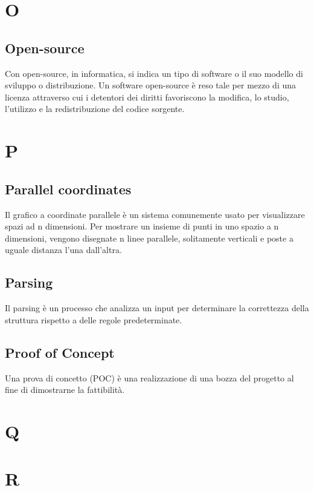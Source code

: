 \section{O}
\subsection{Open-source}
Con open-source, in informatica, si indica un tipo di software o il suo modello di sviluppo o distribuzione. Un software open-source è reso tale per mezzo di una licenza attraverso cui i detentori dei diritti favoriscono la modifica, lo studio, l'utilizzo e la redistribuzione del codice sorgente.

\newpage
\section{P}
\subsection{Parallel coordinates}
Il grafico a coordinate parallele è un sistema comunemente usato per visualizzare spazi ad n dimensioni. Per mostrare un insieme di punti in uno spazio a n dimensioni, vengono disegnate n linee parallele, solitamente verticali e poste a uguale distanza l'una dall'altra.

\subsection{Parsing}
Il parsing è un processo che analizza un input per determinare la correttezza della struttura rispetto a delle regole 
predeterminate.

\subsection{Proof of Concept}
Una prova di concetto (POC) è una realizzazione di una bozza del progetto al fine di dimostrarne la fattibilità. \newline

\newpage
\section{Q}

\newpage
\section{R}

